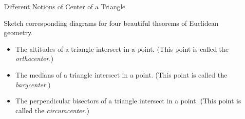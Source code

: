 \begin{exercise}{Different Notions of Center of a Triangle \Coffeecup}

Sketch corresponding diagrams for four beautiful theorems of Euclidean geometry.

\begin{itemize}

\item The altitudes of a triangle intersect in a point.  (This point is called the \emph{orthocenter}.)


\item The medians of a triangle intersect in a point.  (This point is called the \emph{barycenter}.)


\item The perpendicular bisectors of a triangle intersect in a point.  (This point is called the \emph{circumcenter}.)

\end{itemize}
\end{exercise}

